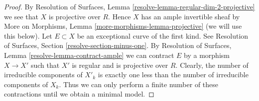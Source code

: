\documentclass[10pt,a4paper]{amsart}
\theoremstyle{plain}
\theoremstyle{definition}
\theoremstyle{remark}
\numberwithin{equation}{subsection}
\begin{document}
\begin{proof}
By Resolution of Surfaces, Lemma \ref{resolve-lemma-regular-dim-2-projective}
we see that $X$ is projective over $R$. Hence $X$ has an ample
invertible sheaf by
More on Morphisms, Lemma \ref{more-morphisms-lemma-projective}
(we will use this below).
Let $E \subset X$ be an exceptional curve of the first kind.
See Resolution of Surfaces, Section \ref{resolve-section-minus-one}.
By Resolution of Surfaces, Lemma \ref{resolve-lemma-contract-ample}
we can contract $E$ by a morphism $X \to X'$ such that $X'$ is
regular and is projective over $R$. Clearly, the number of
irreducible components of $X'_k$ is exactly one less than the
number of irreducible components of $X_k$. Thus we can only
perform a finite number of these contractions until we
obtain a minimal model.
\end{proof}
\end{document}
